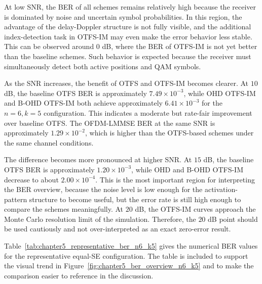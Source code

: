 At low SNR, the BER of all schemes remains relatively high because the receiver is dominated by noise and uncertain symbol probabilities. In this region, the advantage of the delay-Doppler structure is not fully visible, and the additional index-detection task in OTFS-IM may even make the error behavior less stable. This can be observed around \(0\) dB, where the BER of OTFS-IM is not yet better than the baseline schemes. Such behavior is expected because the receiver must simultaneously detect both active positions and QAM symbols.

As the SNR increases, the benefit of OTFS and OTFS-IM becomes clearer. At \(10\) dB, the baseline OTFS BER is approximately \(7.49\times 10^{-3}\), while OHD OTFS-IM and B-OHD OTFS-IM both achieve approximately \(6.41\times 10^{-3}\) for the \(n=6,k=5\) configuration. This indicates a moderate but rate-fair improvement over baseline OTFS. The OFDM-LMMSE BER at the same SNR is approximately \(1.29\times 10^{-2}\), which is higher than the OTFS-based schemes under the same channel conditions.

The difference becomes more pronounced at higher SNR. At \(15\) dB, the baseline OTFS BER is approximately \(1.20\times 10^{-3}\), while OHD and B-OHD OTFS-IM decrease to about \(2.00\times 10^{-4}\). This is the most important region for interpreting the BER overview, because the noise level is low enough for the activation-pattern structure to become useful, but the error rate is still high enough to compare the schemes meaningfully. At \(20\) dB, the OTFS-IM curves approach the Monte Carlo resolution limit of the simulation. Therefore, the \(20\) dB point should be used cautiously and not over-interpreted as an exact zero-error result.

Table~\ref{tab:chapter5_representative_ber_n6_k5} gives the numerical BER values for the representative equal-SE configuration. The table is included to support the visual trend in Figure~\ref{fig:chapter5_ber_overview_n6_k5} and to make the comparison easier to reference in the discussion.


